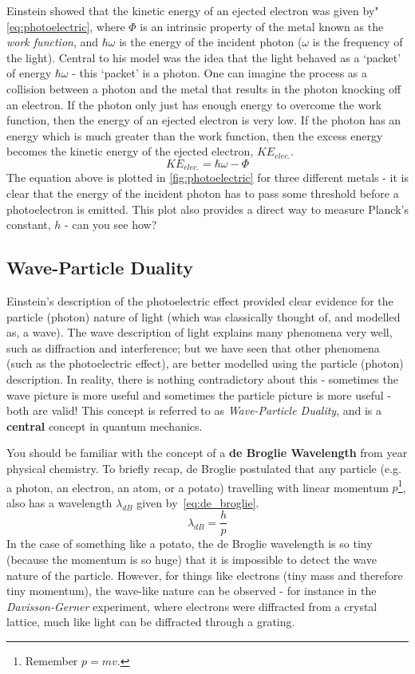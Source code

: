 \documentclass{memoir}[11pt,oneside,a4paper,openany]
\begin{document}
Einstein showed that the kinetic energy of an ejected electron was given by"\autoref{eq:photoelectric}, where $\Phi$ is an intrinsic property of the metal known as the \emph{work function}, and $\hbar\omega$ is the energy of the incident photon ($\omega$ is the frequency of the light). Central to his model was the idea that the light behaved as a `packet' of energy $\hbar\omega$ - this `packet' is a photon. One can imagine the process as a collision between a photon and the metal that results in the photon knocking off an electron. If the photon only just has enough energy to overcome the work function, then the energy of an ejected electron is very low. If the photon has an energy which is much greater than the work function, then the excess energy becomes the kinetic energy of the ejected electron, $KE_{elec.}$. 
\begin{equation}\label{eq:photoelectric}
	KE_{elec.} = \hbar\omega - \Phi
\end{equation}
The equation above is plotted in \autoref{fig:photoelectric} for three different metals - it is clear that the energy of the incident photon has to pass some threshold before a photoelectron is emitted. This plot also provides a direct way to measure Planck's constant, $h$ - can you see how?


\subsection{Wave-Particle Duality}
Einstein's description of the photoelectric effect provided clear evidence for the particle (photon) nature of light (which was classically thought of, and modelled as, a wave). The wave description of light explains many phenomena very well, such as diffraction and interference; but we have seen that other phenomena (such as the photoelectric effect), are better modelled using the particle (photon) description. In reality, there is nothing contradictory about this - sometimes the wave picture is more useful and sometimes the particle picture is more useful - both are valid! This concept is referred to as \emph{Wave-Particle Duality}, and is a \textbf{central} concept in quantum mechanics.

You should be familiar with the concept of a \textbf{de Broglie Wavelength} from  year physical chemistry. To briefly recap, de Broglie postulated that any particle (e.g. a photon, an electron, an atom, or a potato) travelling with linear momentum $p$\footnote{Remember $p = mv$.}, also has a wavelength $\lambda_{dB}$ given by~\autoref{eq:de_broglie}.
\begin{equation}\label{eq:de_broglie}
	\lambda_{dB} = \frac{h}{p}
\end{equation}
In the case of something like a potato, the de Broglie wavelength is so tiny (because the momentum is so huge) that it is impossible to detect the wave nature of the particle. However, for things like electrons (tiny mass and therefore tiny momentum), the wave-like nature can be observed - for instance in the \emph{Davisson-Gerner} experiment, where electrons were diffracted from a crystal lattice, much like light can be diffracted through a grating.
\end{document}
